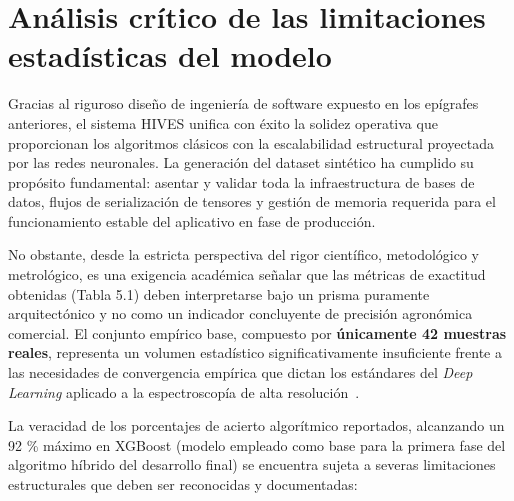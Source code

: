 \FloatBarrier

\section{Análisis crítico de las limitaciones estadísticas del modelo}

Gracias al riguroso diseño de ingeniería de software expuesto en los epígrafes anteriores, el sistema HIVES unifica con éxito la solidez operativa que proporcionan los algoritmos clásicos con la escalabilidad estructural proyectada por las redes neuronales. La generación del dataset sintético ha cumplido su propósito fundamental: asentar y validar toda la infraestructura de bases de datos, flujos de serialización de tensores y gestión de memoria requerida para el funcionamiento estable del aplicativo en fase de producción.

No obstante, desde la estricta perspectiva del rigor científico, metodológico y metrológico, es una exigencia académica señalar que las métricas de exactitud obtenidas (Tabla 5.1) deben interpretarse bajo un prisma puramente arquitectónico y no como un indicador concluyente de precisión agronómica comercial. El conjunto empírico base, compuesto por \textbf{únicamente 42 muestras reales}, representa un volumen estadístico significativamente insuficiente frente a las necesidades de convergencia empírica que dictan los estándares del \textit{Deep Learning} aplicado a la espectroscopía de alta resolución~\cite{goodfellow:deep}.

La veracidad de los porcentajes de acierto algorítmico reportados, alcanzando un 92 \% máximo en XGBoost (modelo empleado como base para la primera fase del algoritmo híbrido del desarrollo final) se encuentra  sujeta a severas limitaciones estructurales que deben ser reconocidas y documentadas:

